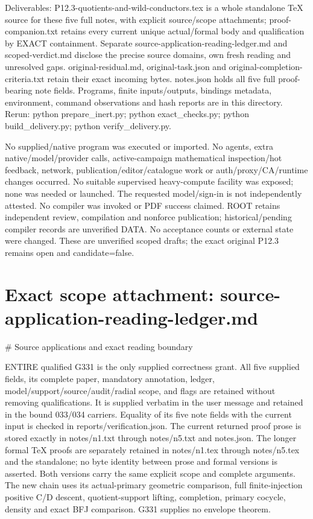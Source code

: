 \documentclass[11pt]{article}
\begin{document}
Deliverables: P12.3-quotients-and-wild-conductors.tex is a whole standalone
TeX source for these five full notes, with explicit source/scope attachments;
proof-companion.txt retains every current unique actual/formal body and
qualification by EXACT containment. Separate source-application-reading-ledger.md
and scoped-verdict.md disclose the precise source domains, own fresh
reading and unresolved gaps. original-residual.md, original-task.json and
original-completion-criteria.txt retain their exact incoming bytes.
notes.json holds all five full proof-bearing note fields. Programs, finite
inputs/outputs, bindings metadata, environment, command observations and
hash reports are in this directory. Rerun: python prepare\_inert.py;
python exact\_checks.py; python build\_delivery.py; python verify\_delivery.py.

No supplied/native program was executed or imported. No agents, extra
native/model/provider calls, active-campaign mathematical inspection/hot
feedback, network, publication/editor/catalogue work or auth/proxy/CA/runtime
changes occurred. No suitable supervised heavy-compute facility was exposed;
none was needed or launched. The requested model/sign-in is not independently
attested. No compiler was invoked or PDF success claimed. ROOT retains
independent review, compilation and nonforce publication; historical/pending
compiler records are unverified DATA. No acceptance counts or external
state were changed. These are unverified scoped drafts; the exact original
P12.3 remains open and candidate=false.

\appendix
\section{Exact scope attachment: source-application-reading-ledger.md}
\# Source applications and exact reading boundary

ENTIRE qualified G331 is the only supplied correctness grant. All five supplied fields, its complete paper, mandatory annotation, ledger, model/support/source/audit/radial scope, and flags are retained without removing qualifications. It is supplied verbatim in the user message and retained in the bound 033/034 carriers. Equality of its five note fields with the current input is checked in reports/verification.json. The current returned proof prose is stored exactly in notes/n1.txt through notes/n5.txt and notes.json. The longer formal TeX proofs are separately retained in notes/n1.tex through notes/n5.tex and the standalone; no byte identity between prose and formal versions is asserted. Both versions carry the same explicit scope and complete arguments. The new chain uses its actual-primary geometric comparison, full finite-injection positive C/D descent, quotient-support lifting, completion, primary cocycle, density and exact BFJ comparison. G331 supplies no envelope theorem.
\end{document}
